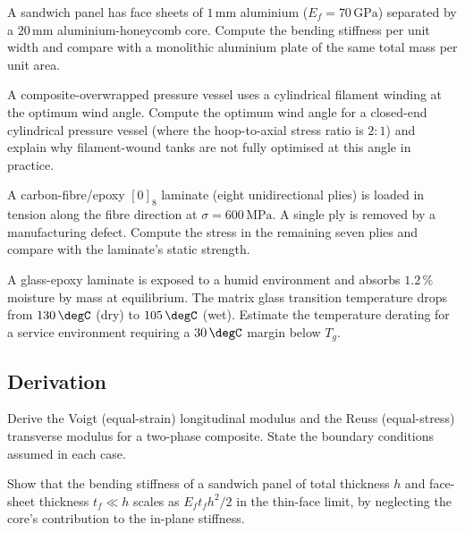 \begin{exercise}
A sandwich panel has face sheets of $1\,\text{mm}$ aluminium ($E_f =
70\,\text{GPa}$) separated by a $20\,\text{mm}$ aluminium-honeycomb
core. Compute the bending stiffness per unit width and compare with a
monolithic aluminium plate of the same total mass per unit area.
\end{exercise}

\begin{exercise}
A composite-overwrapped pressure vessel uses a cylindrical filament
winding at the optimum wind angle. Compute the optimum wind angle for
a closed-end cylindrical pressure vessel (where the hoop-to-axial
stress ratio is $2:1$) and explain why filament-wound tanks are not
fully optimised at this angle in practice.
\end{exercise}

\begin{exercise}
A carbon-fibre/epoxy $[0]_8$ laminate (eight unidirectional plies) is
loaded in tension along the fibre direction at $\sigma = 600\,\text{MPa}$.
A single ply is removed by a manufacturing defect. Compute the stress
in the remaining seven plies and compare with the laminate's static
strength.
\end{exercise}

\begin{exercise}
A glass-epoxy laminate is exposed to a humid environment and absorbs
$1.2\,\%$ moisture by mass at equilibrium. The matrix glass transition
temperature drops from $130\,\degC$ (dry) to $105\,\degC$ (wet).
Estimate the temperature derating for a service environment requiring
a $30\,\degC$ margin below $T_g$.
\end{exercise}

\subsection*{Derivation}

\begin{exercise}
Derive the Voigt (equal-strain) longitudinal modulus and the Reuss
(equal-stress) transverse modulus for a two-phase composite. State the
boundary conditions assumed in each case.
\end{exercise}

\begin{exercise}
Show that the bending stiffness of a sandwich panel of total thickness
$h$ and face-sheet thickness $t_f \ll h$ scales as $E_f t_f h^2 / 2$
in the thin-face limit, by neglecting the core's contribution to the
in-plane stiffness.
\end{exercise}

